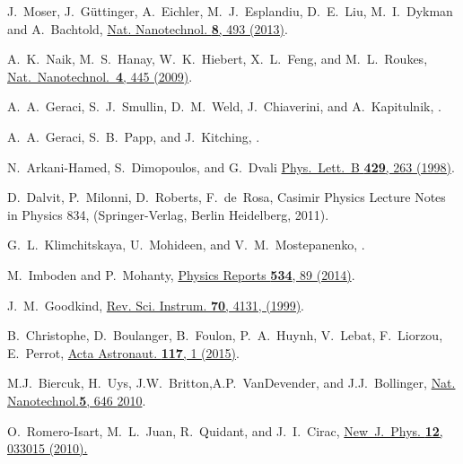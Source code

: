\documentclass[twocolumn,superscriptaddress,floatfix,preprintnumbers,prl]{revtex4}
\begin{document}
\begin{thebibliography}{27}
J.~Moser, J.~G\"{u}ttinger,	A.~Eichler, M.~J.~Esplandiu, D.~E.~Liu, M.~I.~Dykman and A.~Bachtold, \href{http://dx.doi.org/10.1038/nnano.2013.97}{Nat. Nanotechnol. {\bf 8}, 493 (2013)}.


A.~K.~Naik, M.~S.~Hanay, W.~K.~Hiebert, X.~L.~Feng, and M.~L.~Roukes, \href{http://www.nature.com/nnano/journal/v4/n7/full/nnano.2009.152.html}{Nat.~Nanotechnol.~{\bf 4}, 445 (2009)}.

A.~A.~Geraci, S.~J.~Smullin, D.~M.~Weld, J.~Chiaverini, and A.~Kapitulnik, \href{http://journals.aps.org/prd/abstract/10.1103/PhysRevD.78.022002}{}.

A.~A.~Geraci, S.~B.~Papp, and J.~Kitching,
\href{http://journals.aps.org/prl/abstract/10.1103/PhysRevLett.105.101101}{}.

N.~Arkani-Hamed, S.~Dimopoulos, and G.~Dvali \href{http://www.sciencedirect.com/science/article/pii/S0370269398004663}{Phys.~Lett.~B {\bf 429}, 263 (1998)}.


D.~Dalvit, P.~Milonni, D.~Roberts, F.~de~Rosa, Casimir Physics Lecture Notes in Physics 834, (Springer-Verlag, Berlin Heidelberg, 2011).

G.~L.~Klimchitskaya, U.~Mohideen, and V.~M.~Mostepanenko, \href{http://dx.doi.org/10.1103/RevModPhys.81.1827}{}.

M.~Imboden and P.~Mohanty,
\href{http://dx.doi.org/10.1016/j.physrep.2013.09.003}{Physics Reports {\bf 534}, 89 (2014)}.


 J.~M.~Goodkind,
\href{http://scitation.aip.org/content/aip/journal/rsi/70/11/10.1063/1.1150092}{Rev. Sci. Instrum. \textbf{70}, 4131, (1999)}.

B.~Christophe, D.~Boulanger, B.~Foulon, P.~A.~Huynh, V.~Lebat, F.~Liorzou, E.~Perrot,
\href{http://dx.doi.org/10.1016/j.actaastro.2015.06.021}{Acta Astronaut. {\bf 117}, 1 (2015)}.

M.J.~Biercuk, H.~Uys, J.W.~Britton,A.P.~VanDevender, and J.J.~Bollinger, \href{http://www.nature.com/nnano/journal/v5/n9/abs/nnano.2010.165.html}{Nat. Nanotechnol.{\bf 5}, 646 {2010}}.

O.~Romero-Isart, M.~L.~Juan, R.~Quidant, and J.~I.~Cirac, \href{http://iopscience.iop.org/article/10.1088/1367-2630/12/3/033015/meta}{New~J.~Phys. {\bf 12}, 033015 (2010).}


\end{thebibliography}
\end{document}
